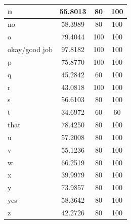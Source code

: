 \documentclass[journal]{./IEEE/IEEEtran}
\begin{document}
\begin{table}[ht!]
\begin{tabular}{|l|c|c|c|}
n                                      & 55.8013                   & 80                      & 100                     \\ \hline
no                                     & 58.3989                   & 80                      & 100                     \\ \hline
o                                      & 79.4044                   & 100                     & 100                     \\ \hline
okay/good job                        & 97.8182                   & 100                     & 100                     \\ \hline
p                                      & 75.8770                   & 100                     & 100                     \\ \hline
q                                      & 45.2842                   & 60                      & 100                     \\ \hline
r                                      & 43.0818                   & 100                     & 100                     \\ \hline
s                                      & 56.6103                   & 80                      & 100                     \\ \hline
t                                      & 34.6972                   & 60                      & 60                      \\ \hline
that                                   & 78.4250                   & 80                      & 100                     \\ \hline
u                                      & 57.2008                   & 80                      & 100                     \\ \hline
v                                      & 55.1236                   & 80                      & 100                     \\ \hline
w                                      & 66.2519                   & 80                      & 100                     \\ \hline
x                                      & 39.9979                   & 80                      & 100                     \\ \hline
y                                      & 73.9857                   & 80                      & 100                     \\ \hline
yes                                    & 58.3642                   & 80                      & 100                     \\ \hline
z                                      & 42.2726                   & 80                      & 100                     \\ \hline
\end{tabular}
\end{table}
\end{document}
